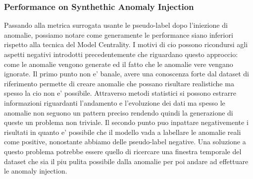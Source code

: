 \subsubsection{Performance on Synthethic Anomaly Injection}
Passando alla metrica surrogata usante le pseudo-label dopo l'iniezione di anomalie, possiamo notare come generamente le performance siano inferiori rispetto alla tecnica del Model Centrality. I motivi di cio possono ricondursi agli aspetti negativi introdotti precedentemente che riguardano questo approccio: come le anomalie vengono generate ed il fatto che le anomalie vere vengano ignorate. Il primo punto non e' banale, avere una conoscenza forte dal dataset di riferimento permette di creare anomalie che possano risultare realistiche ma spesso la cio non e' possibile. Attraverso metodi statistici si possono estrarre informazioni riguardanti l'andamento e l'evoluzione dei dati ma spesso le anomalie non seguono un pattern preciso rendendo quindi la generazione di queste un problema non triviale. Il secondo punto puo inpattare negativemente i risultati in quanto e' possibile che il modello vada a labellare le anomalie reali come positive, nonostante abbiamo delle pseudo-label negative. Una soluzione a questo problema potrebbe essere quello di ricercare una finestra temporale del dataset che sia il piu pulita possibile dalla anomalie per poi andare ad effettuare le anomaly injection.%


